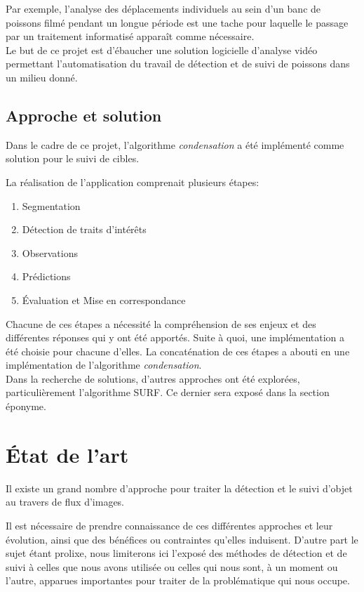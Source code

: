 \documentclass[a4paper,12pt]{report}
\begin{document}
Par exemple, l'analyse des déplacements individuels au sein d'un banc de poissons filmé pendant un longue période est une tache pour laquelle le passage par un traitement informatisé apparaît comme nécessaire.\\

Le but de ce projet est d'ébaucher une solution logicielle d'analyse vidéo permettant l'automatisation du travail de détection et de suivi de poissons dans un milieu donné. 

\section{Approche et solution}
Dans le cadre de ce projet, l'algorithme \textit{condensation} a été implémenté comme solution pour le suivi de cibles.

La réalisation de l'application comprenait plusieurs étapes:
\begin{enumerate}
\item Segmentation
\item Détection de traits d'intérêts 
\item Observations
\item Prédictions
\item Évaluation et Mise en correspondance
\end{enumerate}
Chacune de ces étapes a nécessité la compréhension de ses enjeux et des différentes réponses qui y ont été apportés. Suite à quoi, une implémentation a été choisie pour chacune d'elles.
La concaténation de ces étapes a abouti en une implémentation de l'algorithme \textit{condensation}.\\

Dans la recherche de solutions, d'autres approches ont été explorées, particulièrement l'algorithme SURF. Ce dernier sera exposé dans la section éponyme.  


\chapter{\'{E}tat de l'art}

Il existe un grand nombre d'approche pour traiter la détection et le suivi d'objet au travers de flux d'images. 

Il est nécessaire de prendre connaissance de ces différentes approches et leur évolution, ainsi que des bénéfices ou contraintes qu'elles induisent. D'autre part le sujet étant prolixe, nous limiterons ici l'exposé des méthodes de détection et de suivi à celles que nous avons utilisée ou celles qui nous sont, à un moment ou l'autre, apparues importantes pour traiter de la problématique qui nous occupe.
\end{document}
